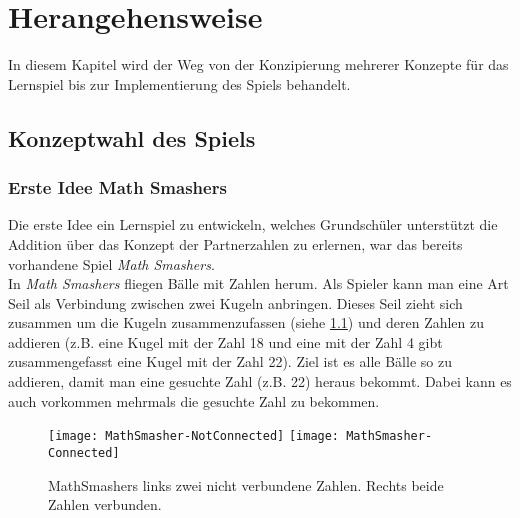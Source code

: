 %
\chapter{Herangehensweise}
In diesem Kapitel wird der Weg von der Konzipierung mehrerer Konzepte für das Lernspiel bis zur Implementierung des Spiels behandelt.
\section{Konzeptwahl des Spiels}
\subsection{Erste Idee Math Smashers}
Die erste Idee ein Lernspiel zu entwickeln, welches Grundschüler unterstützt die Addition über das Konzept der Partnerzahlen zu erlernen, war das bereits vorhandene Spiel \textit{Math Smashers}\cite{ludoscience}.\\
In \textit{Math Smashers} fliegen Bälle mit Zahlen herum. Als Spieler kann man eine Art Seil als Verbindung zwischen zwei Kugeln anbringen. Dieses Seil zieht sich zusammen um die Kugeln zusammenzufassen (siehe \ref{fig:mathsmashers}) und deren Zahlen zu addieren (z.B. eine Kugel mit der Zahl 18 und eine mit der Zahl 4 gibt zusammengefasst eine Kugel mit der Zahl 22). Ziel ist es alle Bälle so zu addieren, damit man eine gesuchte Zahl (z.B. 22) heraus bekommt. Dabei kann es auch vorkommen mehrmals die gesuchte Zahl zu bekommen.
\begin{figure}[htb]
	\centering
	\texttt{[image: MathSmasher-NotConnected]}
	\texttt{[image: MathSmasher-Connected]}
	\caption{MathSmashers links zwei nicht verbundene Zahlen. Rechts beide Zahlen verbunden.\label{fig:mathsmashers}}
\end{figure}
